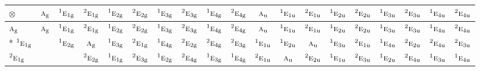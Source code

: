\documentclass[10pt,a4paper]{article}
\numberwithin{equation}{section}
\newcommand{\irr}[1]{\text{\normalfont\scshape #1}}
\newcommand{\conjpair}[1]{{}^{#1}}
\newcommand{\ptag}[1]{\mathrm{#1}}
\newcommand{\irrprod}{\otimes}
\begin{document}
{\small\setlength{\tabcolsep}{3pt}\begin{longtable}{@{}lcccccccccccccccccc@{}}\toprule
$\irrprod$ & $\irr{a}_{\ptag{g}}$ & $\conjpair{1}\irr{e}_{1\ptag{g}}$ & $\conjpair{2}\irr{e}_{1\ptag{g}}$ & $\conjpair{1}\irr{e}_{2\ptag{g}}$ & $\conjpair{2}\irr{e}_{2\ptag{g}}$ & $\conjpair{1}\irr{e}_{3\ptag{g}}$ & $\conjpair{2}\irr{e}_{3\ptag{g}}$ & $\conjpair{1}\irr{e}_{4\ptag{g}}$ & $\conjpair{2}\irr{e}_{4\ptag{g}}$ & $\irr{a}_{\ptag{u}}$ & $\conjpair{1}\irr{e}_{1\ptag{u}}$ & $\conjpair{2}\irr{e}_{1\ptag{u}}$ & $\conjpair{1}\irr{e}_{2\ptag{u}}$ & $\conjpair{2}\irr{e}_{2\ptag{u}}$ & $\conjpair{1}\irr{e}_{3\ptag{u}}$ & $\conjpair{2}\irr{e}_{3\ptag{u}}$ & $\conjpair{1}\irr{e}_{4\ptag{u}}$ & $\conjpair{2}\irr{e}_{4\ptag{u}}$\\\midrule\endhead
\bottomrule\endfoot\endlastfoot
$\irr{a}_{\ptag{g}}$ & $\irr{a}_{\ptag{g}}$ & $\conjpair{1}\irr{e}_{1\ptag{g}}$ & $\conjpair{2}\irr{e}_{1\ptag{g}}$ & $\conjpair{1}\irr{e}_{2\ptag{g}}$ & $\conjpair{2}\irr{e}_{2\ptag{g}}$ & $\conjpair{1}\irr{e}_{3\ptag{g}}$ & $\conjpair{2}\irr{e}_{3\ptag{g}}$ & $\conjpair{1}\irr{e}_{4\ptag{g}}$ & $\conjpair{2}\irr{e}_{4\ptag{g}}$ & $\irr{a}_{\ptag{u}}$ & $\conjpair{1}\irr{e}_{1\ptag{u}}$ & $\conjpair{2}\irr{e}_{1\ptag{u}}$ & $\conjpair{1}\irr{e}_{2\ptag{u}}$ & $\conjpair{2}\irr{e}_{2\ptag{u}}$ & $\conjpair{1}\irr{e}_{3\ptag{u}}$ & $\conjpair{2}\irr{e}_{3\ptag{u}}$ & $\conjpair{1}\irr{e}_{4\ptag{u}}$ & $\conjpair{2}\irr{e}_{4\ptag{u}}$\\*
$\conjpair{1}\irr{e}_{1\ptag{g}}$ &  & $\conjpair{1}\irr{e}_{2\ptag{g}}$ & $\irr{a}_{\ptag{g}}$ & $\conjpair{1}\irr{e}_{3\ptag{g}}$ & $\conjpair{2}\irr{e}_{1\ptag{g}}$ & $\conjpair{1}\irr{e}_{4\ptag{g}}$ & $\conjpair{2}\irr{e}_{2\ptag{g}}$ & $\conjpair{2}\irr{e}_{4\ptag{g}}$ & $\conjpair{2}\irr{e}_{3\ptag{g}}$ & $\conjpair{1}\irr{e}_{1\ptag{u}}$ & $\conjpair{1}\irr{e}_{2\ptag{u}}$ & $\irr{a}_{\ptag{u}}$ & $\conjpair{1}\irr{e}_{3\ptag{u}}$ & $\conjpair{2}\irr{e}_{1\ptag{u}}$ & $\conjpair{1}\irr{e}_{4\ptag{u}}$ & $\conjpair{2}\irr{e}_{2\ptag{u}}$ & $\conjpair{2}\irr{e}_{4\ptag{u}}$ & $\conjpair{2}\irr{e}_{3\ptag{u}}$\\
$\conjpair{2}\irr{e}_{1\ptag{g}}$ &  &  & $\conjpair{2}\irr{e}_{2\ptag{g}}$ & $\conjpair{1}\irr{e}_{1\ptag{g}}$ & $\conjpair{2}\irr{e}_{3\ptag{g}}$ & $\conjpair{1}\irr{e}_{2\ptag{g}}$ & $\conjpair{2}\irr{e}_{4\ptag{g}}$ & $\conjpair{1}\irr{e}_{3\ptag{g}}$ & $\conjpair{1}\irr{e}_{4\ptag{g}}$ & $\conjpair{2}\irr{e}_{1\ptag{u}}$ & $\irr{a}_{\ptag{u}}$ & $\conjpair{2}\irr{e}_{2\ptag{u}}$ & $\conjpair{1}\irr{e}_{1\ptag{u}}$ & $\conjpair{2}\irr{e}_{3\ptag{u}}$ & $\conjpair{1}\irr{e}_{2\ptag{u}}$ & $\conjpair{2}\irr{e}_{4\ptag{u}}$ & $\conjpair{1}\irr{e}_{3\ptag{u}}$ & $\conjpair{1}\irr{e}_{4\ptag{u}}$\\

\end{longtable}}
\end{document}

